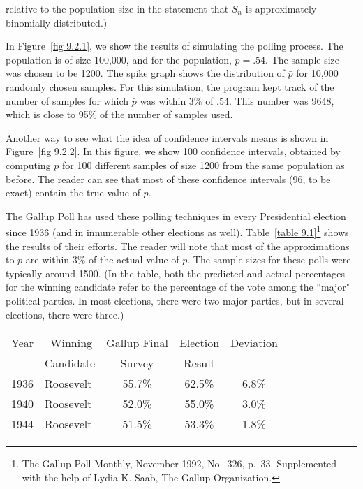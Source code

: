 \begin{example}
relative to the population size in the statement that $S_n$ is approximately binomially
distributed.)
\par
In Figure~\ref{fig 9.2.1}, we show the results of simulating the polling process.  The population
is of size 100{,}000, and for the population, $p = .54$.  The sample size was chosen to be
1200.  The spike graph shows the distribution of $\bar p$ for 10{,}000 randomly chosen
samples.   For this simulation, the program kept track of the number of samples for which
$\bar p$ was within 3\% of .54.  This number was 9648, which is close to
95\% of the number of samples used.
\par                        
Another way to see what the idea of confidence intervals means is shown in Figure~\ref{fig
9.2.2}.  In this figure, we show 100 confidence intervals, obtained by computing $\bar p$
for 100 different samples of size 1200 from the same population as before.  The reader can see
that most of these confidence intervals (96, to be exact) contain the true value of $p$.
\par
The Gallup Poll has used these polling techniques in every
Presidential election since 1936 (and in innumerable other
elections as well).  Table~\ref{table 9.1}\footnote{The Gallup Poll Monthly, November 1992, 
No.\ 326, p.\ 33.  Supplemented with the help of Lydia K. Saab, The Gallup Organization.} shows
the results of their efforts.  The reader will note that most of the approximations to $p$ are
within 3\% of the actual value of $p$.  The sample sizes for these polls were typically around
1500.  (In the table, both the predicted and actual percentages for the winning candidate refer
to the percentage of the vote among the ``major" political parties. In most elections, there were
two major parties, but in several elections, there were three.) 
\begin{table}
\centering
\begin{tabular}{clccc} Year &$\,$ Winning &Gallup Final &Election 
&Deviation \\
&Candidate&Survey&Result&\\
\hline
1936 & Roosevelt  & 55.7\% & 62.5\% & 6.8\%\\
1940 & Roosevelt  & 52.0\% & 55.0\% & 3.0\%\\
1944 & Roosevelt  & 51.5\% & 53.3\% & 1.8\%\\

\end{tabular}
\end{table}
\end{example}
